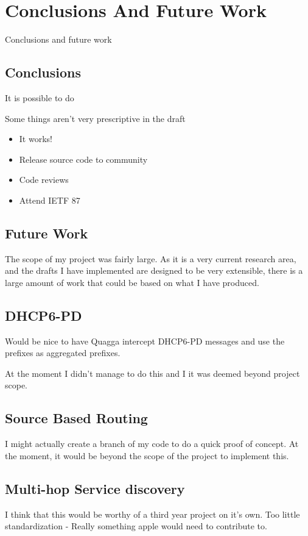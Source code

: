 \documentclass[12pt]{report}
\begin{document}
\chapter{Conclusions And Future Work}
Conclusions and future work

\section{Conclusions}

It is possible to do

Some things aren't very prescriptive in the draft

\begin{itemize}
\item It works! 
\item Release source code to community
\item Code reviews
\item Attend IETF 87
\end{itemize}

\section{Future Work}
The scope of my project was fairly large. As it is a very current research
area, and the drafts I have implemented are designed to be very extensible,
there is a large amount of work that could be based on what I have
produced. 

\section{DHCP6-PD}
Would be nice to have Quagga intercept DHCP6-PD messages and use the prefixes
as aggregated prefixes. 

At the moment I didn't manage to do this and I it was deemed beyond project
scope.

\section{Source Based Routing}
I might actually create a branch of my code to do a quick proof of concept. At
the moment, it would be beyond the scope of the project to implement this. 

\section{Multi-hop Service discovery}
I think that this would be worthy of a third year project on it's own.  Too
little standardization - Really something apple would need to contribute to. 
\end{document}
